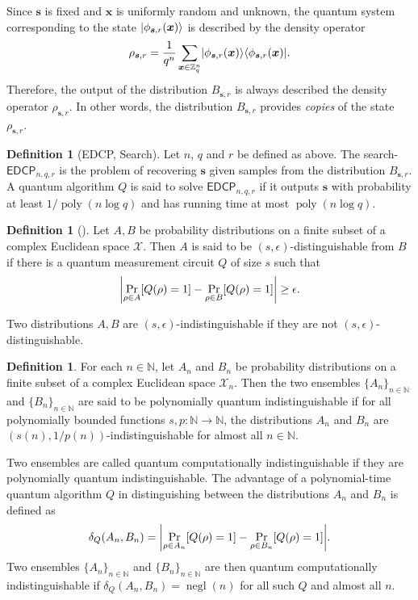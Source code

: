 \documentclass[11pt]{article}
\theoremstyle{plain}
\theoremstyle{definition}
\newtheorem{definition}[theorem]{Definition}
\DeclareMathOperator{\negl}{negl} %
\DeclareMathOperator{\poly}{poly}
\DeclarePairedDelimiter{\abs}{\lvert}{\rvert}
\DeclarePairedDelimiter{\ldbrac}{\lvert}{\rangle}
\DeclarePairedDelimiter{\rdbrac}{\langle}{\rvert}
\def\N{\ensuremath{\mathbb{N}}}
\def\Z{\ensuremath{\mathbb{Z}}}
\def\edcp{\ensuremath{\mathsf{EDCP}}}
\begin{document}
Since $\bm{s}$ is fixed and $\bm{x}$ is uniformly random and unknown, the quantum system corresponding to the state $\ldbrac{\phi_{\bm{s}, r}(\bm{x})}$ is described by the density operator
\[ \rho_{\bm{s}, r} = \frac{1}{q^n} \sum_{\bm{x} \in \Z_q^n} \ldbrac{\phi_{\bm{s}, r}(\bm{x})} \rdbrac{\phi_{\bm{s}, r}(\bm{x})}. \]
Therefore, the output of the distribution $B_{\bm{s}, r}$ is always described the density operator $\rho_{\bm{s}, r}$. In other words, the distribution $B_{\bm{s}, r}$ provides \textit{copies} of the state $\rho_{\bm{s}, r}$.
\begin{definition}[EDCP, Search]
    Let $n$, $q$ and $r$ be defined as above. The search-$\edcp_{n, q, r}$ is the problem of recovering $\bm{s}$ given samples from the distribution $B_{\bm{s}, r}$. A quantum algorithm $Q$ is said to solve $\edcp_{n, q, r}$ if it outputs $\bm{s}$ with probability at least $1 / \poly(n\log q)$ and has running time at most $\poly(n\log q)$.
\end{definition}
\begin{definition}[\cite{watrous2009zero}]
    Let $A, B$ be probability distributions on a finite subset of a complex Euclidean space $\mathcal{X}$. Then $A$ is said to be $(s, \epsilon)$-distinguishable from $B$ if there is a quantum measurement circuit $Q$ of size $s$ such that
    \[ \abs*{ \Pr_{\rho \in A}[Q(\rho) = 1] - \Pr_{\rho \in B}[Q(\rho) = 1] } \ge \epsilon. \]
\end{definition} 
Two distributions $A, B$ are $(s, \epsilon)$-indistinguishable if they are not $(s, \epsilon)$-distinguishable.
\begin{definition}
    For each $n \in \N$, let $A_n$ and $B_n$ be probability distributions on a finite subset of a complex Euclidean space $\mathcal{X}_n$. Then the two ensembles $\{ A_n \}_{n \in \N}$ and $\{ B_n \}_{n \in \N}$ are said to be polynomially quantum indistinguishable if for all polynomially bounded functions $s, p: \N \rightarrow \N$, the distributions $A_n$ and $B_n$ are $(s(n), 1 / p(n))$-indistinguishable for almost all $n \in \N$.
\end{definition}
Two ensembles are called quantum computationally indistinguishable if they are polynomially quantum indistinguishable. The advantage of a polynomial-time quantum algorithm $Q$ in distinguishing between the distributions $A_n$ and $B_n$ is defined as
\[ \delta_Q(A_n, B_n) = \abs*{ \Pr_{\rho \in A_n}[Q(\rho) = 1] - \Pr_{\rho \in B_n}[Q(\rho) = 1] }. \]
Two ensembles $\{ A_n \}_{n \in \N}$ and $\{ B_n \}_{n \in \N}$ are then quantum computationally indistinguishable if $\delta_Q(A_n, B_n) = \negl(n)$ for all such $Q$ and almost all $n$. 
\end{document}
